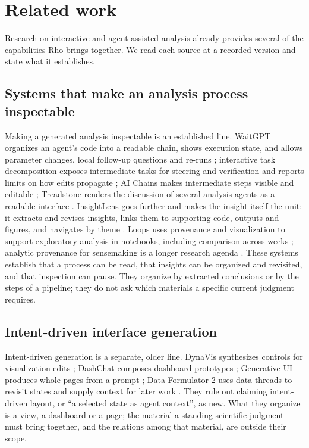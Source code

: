 \documentclass[11pt]{article}
\begin{document}
\section{Related work}\label{related-work}

Research on interactive and agent-assisted analysis already provides several of the capabilities Rho brings together. We read each source at a recorded version and state what it establishes.

\subsection{Systems that make an analysis process inspectable}\label{rw-inspectable}

Making a generated analysis inspectable is an established line. WaitGPT organizes an agent's code into a readable chain, shows execution state, and allows parameter changes, local follow-up questions and re-runs \cite{waitgpt}; interactive task decomposition exposes intermediate tasks for steering and verification and reports limits on how edits propagate \cite{decomposition}; AI Chains makes intermediate steps visible and editable \cite{aichains}; Treadstone renders the discussion of several analysis agents as a readable interface \cite{treadstone}. InsightLens goes further and makes the insight itself the unit: it extracts and revises insights, links them to supporting code, outputs and figures, and navigates by theme \cite{insightlens}. Loops uses provenance and visualization to support exploratory analysis in notebooks, including comparison across weeks \cite{loops}; analytic provenance for sensemaking is a longer research agenda \cite{analyticprovenance}. These systems establish that a process can be read, that insights can be organized and revisited, and that inspection can pause. They organize by extracted conclusions or by the steps of a pipeline; they do not ask which materials a specific current judgment requires.

\subsection{Intent-driven interface generation}\label{rw-intent}

Intent-driven generation is a separate, older line. DynaVis synthesizes controls for visualization edits \cite{dynavis}; DashChat composes dashboard prototypes \cite{dashchat}; Generative UI produces whole pages from a prompt \cite{generativeui}; Data Formulator 2 uses data threads to revisit states and supply context for later work \cite{dataformulator}. They rule out claiming intent-driven layout, or ``a selected state as agent context'', as new. What they organize is a view, a dashboard or a page; the material a standing scientific judgment must bring together, and the relations among that material, are outside their scope.
\end{document}
